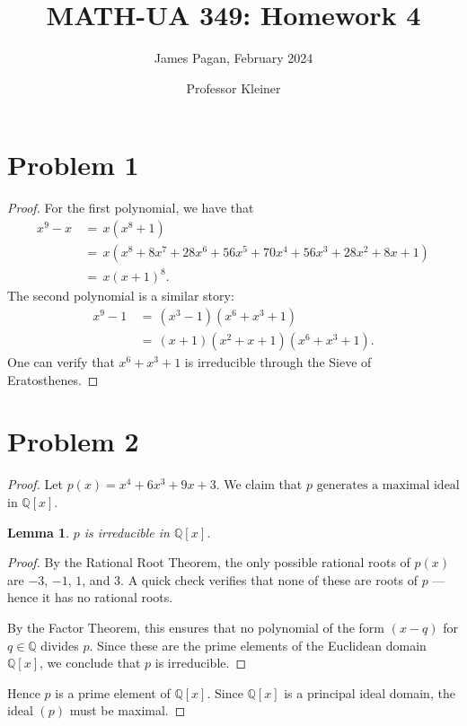 \documentclass[11pt]{article}
\title{MATH-UA 349: Homework 4}
\author{James Pagan, February 2024}
\date{Professor Kleiner}
\newtheorem{lemma}{Lemma}
\begin{document}
\maketitle
\tableofcontents
\newpage


\section{Problem 1}

\begin{proof}
  For the first polynomial, we have that
  \begin{align*}
    x^{9} - x \, &= \, x(x^{8} + 1) \\
                 &= \, x(x^{8} + 8x^{7} + 28x^{6} + 56x^{5} + 70x^{4} + 56x^{3} + 28x^{2} + 8x + 1) \\
                 &= \, \boxed{x(x + 1)^{8}}.
  \end{align*}
  The second polynomial is a similar story:
  \begin{align*}
    x^{9} - 1 \, &= \, (x^{3} - 1)(x^{6} + x^{3} + 1) \\
                 &= \, \boxed{(x + 1)(x^{2} + x + 1)(x^{6} + x^{3} + 1)}.
  \end{align*}
  One can verify that $x^{6} + x^{3} + 1$ is irreducible through the Sieve of Eratosthenes.
\end{proof}


\section{Problem 2}

\begin{proof}
  Let $p(x) = x^{4} + 6x^{3} + 9x + 3$. We claim that $\boxed{\text{$p$ generates a maximal ideal}}$ in $\mathbb{Q}[x]$.
  
  \begin{adjustwidth}{0.5cm}{}
    \begin{lemma}
      $p$ is irreducible in $\mathbb{Q}[x]$.
    \end{lemma}
    \begin{proof}\renewcommand{\qedsymbol}{}
      By the Rational Root Theorem, the only possible rational roots of $p(x)$ are $-3$, $-1$, $1$, and $3$. A quick check verifies that none of these are roots of $p$ --- hence it has no rational roots.
  
      By the Factor Theorem, this ensures that no polynomial of the form $(x - q)$ for $q \in \mathbb{Q}$ divides $p$. Since these are the prime elements of the Euclidean domain $\mathbb{Q}[x]$, we conclude that $p$ is irreducible.
    \end{proof}
  \end{adjustwidth}
  
  Hence $p$ is a prime element of $\mathbb{Q}[x]$. Since $\mathbb{Q}[x]$ is a principal ideal domain, the ideal $(p)$ must be maximal.
\end{proof}
\end{document}
